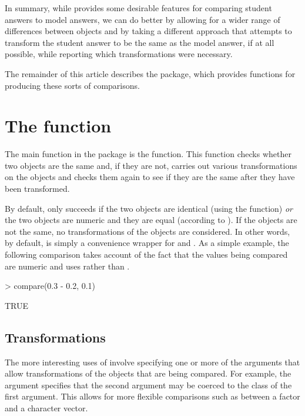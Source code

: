 In summary, while  provides some desirable features
for comparing student answers to model answers,
we can do better by allowing for a wider range of differences between
objects and by taking a different approach that
attempts to transform the student answer to be the same as the
model answer, if at all possible, while reporting which
transformations were necessary.

The remainder of this article describes the  package,
which provides functions for producing these sorts of comparisons.

\section*{The  function}

The main function in the  package is the
 function.  This function checks whether two 
objects are the same and, if they are not, carries out various
transformations on the objects and checks them again to see if
they are the same after they have been transformed.

By default,  only succeeds if the two objects are
identical (using the  function) \emph{or} the two
objects are numeric and they are equal
(according to ).  If the objects are not the same,
no transformations
of the objects are considered.  In other words, by default, 
 is simply a convenience wrapper for 
 and .  As a simple example,
the following comparison takes account of the fact that the 
values being compared are numeric and uses 
rather than .

\begin{Schunk}
\begin{Sinput}
> compare(0.3 - 0.2, 0.1)
\end{Sinput}
\begin{Soutput}
TRUE
\end{Soutput}
\end{Schunk}
\subsection*{Transformations}

The more interesting uses of  involve specifying
one or more of the arguments that
allow transformations of the objects that are being compared.
For example, the  argument specifies that the second
argument may be coerced to the class of the first argument.
This allows for more flexible comparisons such as between
a factor and a character
vector.

